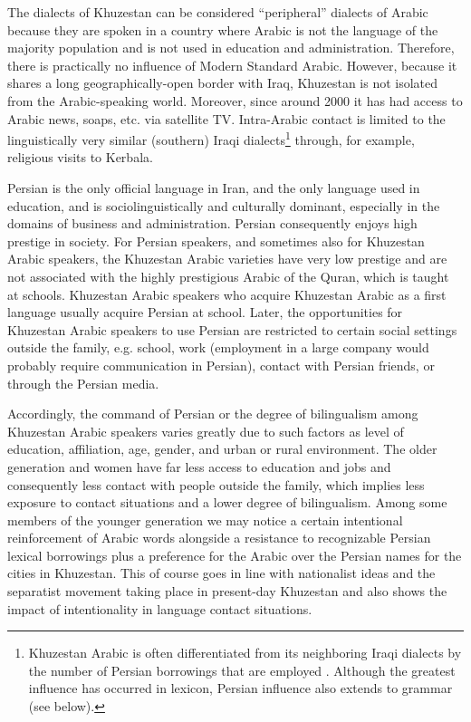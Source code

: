 \documentclass[output=paper,nonflat]{langsci/langscibook}
\begin{document}
The dialects of Khuzestan can be considered “peripheral” dialects of Arabic because they are spoken in a country where Arabic is not the language of the majority population and is not used in education and administration. Therefore, there is practically no influence of Modern Standard Arabic. However, because it shares a long geographically-open border with Iraq, Khuzestan is not isolated from the Arabic-speaking world. Moreover, since around 2000 it has had access to Arabic news, soaps, etc. via satellite TV. Intra-Arabic contact is limited to the linguistically very similar (southern) Iraqi dialects\footnote{Khuzestan Arabic is often differentiated from its neighboring Iraqi dialects by the number of Persian borrowings that are employed \citep[1020]{Gazsi2011}. Although the greatest influence has occurred in lexicon, Persian influence also extends to grammar (see below).} through, for example, religious visits to Kerbala.

Persian is the only official language in Iran, and the only language used in education, and is sociolinguistically and culturally dominant, especially in the domains of business and administration. Persian consequently enjoys high prestige in society. For Persian speakers, and sometimes also for Khuzestan Arabic speakers, the Khuzestan Arabic varieties have very low prestige and are not associated with the highly prestigious Arabic of the Quran, which is taught at schools. Khuzestan Arabic speakers who acquire Khuzestan Arabic as a first language usually acquire Persian at school. Later, the opportunities for Khuzestan Arabic speakers to use Persian are restricted to certain social settings outside the family, e.g. school, work (employment in a large company would probably require communication in Persian), contact with Persian friends, or through the Persian media.

Accordingly, the command of Persian or the degree of bilingualism among Khuzestan Arabic speakers varies greatly due to such factors as level of education, affiliation, age, gender, and urban or rural environment. The older generation and women have far less access to education and jobs and consequently less contact with people outside the family, which implies less exposure to contact situations and a lower degree of bilingualism. Among some members of the younger generation we may notice a certain intentional reinforcement of Arabic words alongside a resistance to recognizable Persian lexical borrowings plus a preference for the Arabic over the Persian names for the cities in Khuzestan. This of course goes in line with nationalist ideas and the separatist movement taking place in present-day Khuzestan and also shows the impact of intentionality in language contact situations. 
\end{document}
